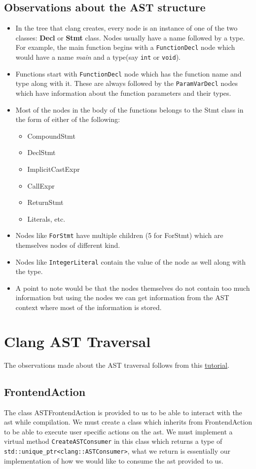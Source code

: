 \documentclass[12pt]{article}
\newcommand{\code}{\texttt}
\begin{document}
\subsection{Observations about the AST structure}
\begin{itemize}
\item In the tree that clang creates, every node is an instance of one of the two classes: \textbf{Decl} or \textbf{Stmt} class. Nodes usually have a name followed by a type. For example, the main function begins with a \code{FunctionDecl} node which would have a name \textit{main} and a type(say \code{int} or \code{void}).
\item Functions start with \code{FunctionDecl} node which has the function name and type along with it. These are always followed by the \code{ParamVarDecl} nodes which have information about the function parameters and their types.
\item Most of the nodes in the body of the functions belongs to the Stmt class in the form of either of the following:
\begin{itemize}
\item CompoundStmt
\item DeclStmt
\item ImplicitCastExpr
\item CallExpr
\item ReturnStmt
\item Literals, etc.
\end{itemize}
\item Nodes like \code{ForStmt} have multiple children (5 for ForStmt) which are themselves nodes of different kind.
\item Nodes like \code{IntegerLiteral} contain the value of the node as well along with the type.
\item A point to note would be that the nodes themselves do not contain too much information but using the nodes we can get information from the AST context where most of the information is stored.
\end{itemize}
\newpage
\section{Clang AST Traversal}
The observations made about the AST traversal follows from this \href{http://clang.llvm.org/docs/RAVFrontendAction.html}{tutorial}.
\subsection{FrontendAction}
The class ASTFrontendAction is provided to us to be able to interact with the ast while compilation. We must create a class which inherits from FrontendAction to be able to execute user specific actions on the ast. We must implement a virtual method \code{CreateASTConsumer} in this class which returns a type of \code{std::unique\_ptr<clang::ASTConsumer>}, what we return is essentially our implementation of how we would like to consume the ast provided to us.
\end{document}
